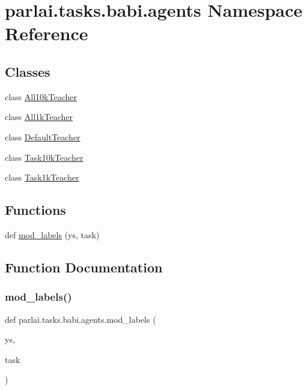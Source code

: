 \hypertarget{namespaceparlai_1_1tasks_1_1babi_1_1agents}{}\section{parlai.\+tasks.\+babi.\+agents Namespace Reference}
\label{namespaceparlai_1_1tasks_1_1babi_1_1agents}
\subsection*{Classes}
\begin{DoxyCompactItemize}
\item 
class \hyperlink{classparlai_1_1tasks_1_1babi_1_1agents_1_1All10kTeacher}{All10k\+Teacher}
\item 
class \hyperlink{classparlai_1_1tasks_1_1babi_1_1agents_1_1All1kTeacher}{All1k\+Teacher}
\item 
class \hyperlink{classparlai_1_1tasks_1_1babi_1_1agents_1_1DefaultTeacher}{Default\+Teacher}
\item 
class \hyperlink{classparlai_1_1tasks_1_1babi_1_1agents_1_1Task10kTeacher}{Task10k\+Teacher}
\item 
class \hyperlink{classparlai_1_1tasks_1_1babi_1_1agents_1_1Task1kTeacher}{Task1k\+Teacher}
\end{DoxyCompactItemize}
\subsection*{Functions}
\begin{DoxyCompactItemize}
\item 
def \hyperlink{namespaceparlai_1_1tasks_1_1babi_1_1agents_a80ee701751bc608fcb01bcfb1e884de0}{mod\+\_\+labels} (ys, task)
\end{DoxyCompactItemize}


\subsection{Function Documentation}
\mbox{\label{namespaceparlai_1_1tasks_1_1babi_1_1agents_a80ee701751bc608fcb01bcfb1e884de0}} 
\subsubsection{\texorpdfstring{mod\+\_\+labels()}{mod\_labels()}}
{\footnotesize\ttfamily def parlai.\+tasks.\+babi.\+agents.\+mod\+\_\+labels (\begin{DoxyParamCaption}\item[{}]{ys,  }\item[{}]{task }\end{DoxyParamCaption})}

